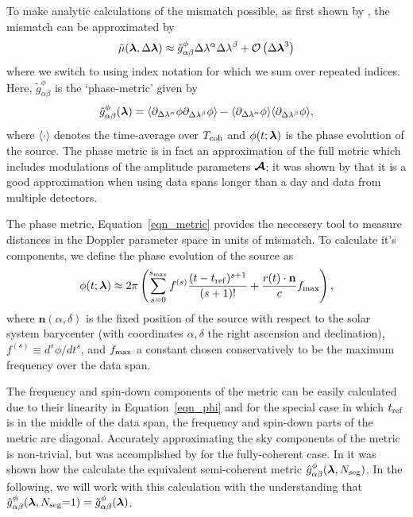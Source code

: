 \documentclass[aps, prd, twocolumn, superscriptaddress, floatfix, showpacs, nofootinbib, longbibliography]{revtex4-1}
\begin{document}
To make analytic calculations of the mismatch possible, as first shown by
\citet{brady1998}, the mismatch can be approximated by
\begin{equation}
\tilde{\mu}(\boldsymbol{\mathbf{\lambda}}, \Delta\boldsymbol{\mathbf{\lambda}}) \approx 
\tilde{g}_{\alpha \beta}^{\phi} \Delta\lambda^{\alpha}\Delta\lambda^{\beta}
+ \mathcal{O}\left(\Delta\boldsymbol{\mathbf{\lambda}}^{3}\right)
\end{equation}
where we switch to using index notation for which we sum over repeated indices.
Here, $\tilde{g}_{\alpha\beta}^{\phi}$ is the `phase-metric' given by
\begin{align}
\tilde{g}^{\phi}_{\alpha \beta}(\boldsymbol{\mathbf{\lambda}}) = 
\langle 
\partial_{\Delta\lambda^{\alpha}}\phi
\partial_{\Delta\lambda^{\beta}}\phi
\rangle
-
\langle 
\partial_{\Delta\lambda^{\alpha}}\phi
\rangle
\langle
\partial_{\Delta\lambda^{\beta}}\phi
\rangle,
\label{eqn_metric}
\end{align}
where $\langle \cdot \rangle$ denotes the time-average over $T_{\rm coh}$ and
$\phi(t; \boldsymbol{\mathbf{\lambda}})$ is the phase evolution of the source. The phase metric is
in fact an approximation of the full metric which includes modulations of the
amplitude parameters $\boldsymbol{\mathcal{A}}$; it was shown by \citet{prix2007metric} that it is a
good approximation when using data spans longer than a day and data from
multiple detectors. 

The phase metric, Equation~\eqref{eqn_metric} provides the neccesery tool to
measure distances in the Doppler parameter space in units of mismatch. To
calculate it's components, we define the phase evolution
of the source as \citep{wette2015}
\begin{align}
\phi(t; \boldsymbol{\mathbf{\lambda}}) \approx 2\pi\left(
\sum_{s=0}^{s_{\textrm{max}}} f^{(s)}\frac{(t-t_{\rm ref})^{s+1}}{(s+1)!}
+ \frac{r(t)\cdot\mathbf{n}}{c} f_{\textrm{max}}\right),
\label{eqn_phi}
\end{align}
where $\mathbf{n}(\alpha, \delta)$ is the fixed position of the source with
respect to the solar system barycenter (with coordinates $\alpha, \delta$ the
right ascension and declination), $f^(s)\equiv d^{s}\phi/dt^s$, and $f_{\textrm{max}}$
a constant chosen conservatively to be the maximum frequency over the data
span.

The frequency and spin-down components of the metric can be easily calculated
due to their linearity in Equation~\eqref{eqn_phi} and for the special case in
which $t_{\rm ref}$ is in the middle of the data span, the frequency and spin-down
parts of the metric are diagonal. Accurately approximating the sky components
of the metric is non-trivial, but was accomplished by \citet{wette2013} for the
fully-coherent case. In \citet{wette2015} it was shown how the calculate the
equivalent semi-coherent metric $\hat{g}_{\alpha\beta}^{\phi}(\boldsymbol{\mathbf{\lambda}},
N_{\rm seg})$.  In the following, we will work with this calculation with the
understanding that $\hat{g}_{\alpha\beta}^{\phi}(\boldsymbol{\mathbf{\lambda}}, N_{\rm seg}{=}1)=
\tilde{g}_{\alpha\beta}^{\phi}(\boldsymbol{\mathbf{\lambda}})$.
\end{document}
